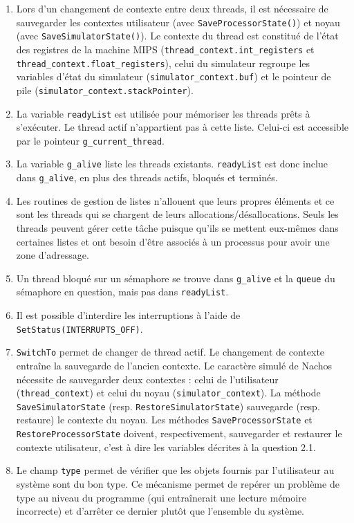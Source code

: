 \documentclass[a4paper,11pt,french]{article}
\begin{document}
\begin{enumerate}
\item Lors d'un changement de contexte entre deux threads, il est nécessaire de sauvegarder les contextes utilisateur (avec \texttt{SaveProcessorState()}) et noyau (avec \texttt{SaveSimulatorState()}). Le contexte du thread est constitué de l'état des registres de la machine MIPS (\texttt{thread\_context.int\_registers} et \texttt{thread\_context.float\_registers}), celui du simulateur regroupe les variables d'état du simulateur (\texttt{simulator\_context.buf}) et le pointeur de pile (\texttt{simulator\_context.stackPointer}).
\item La variable \texttt{readyList} est utilisée pour mémoriser les threads prêts à s'exécuter. Le thread actif n'appartient pas à cette liste. Celui-ci est accessible par le pointeur \texttt{g\_current\_thread}.
\item La variable \texttt{g\_alive} liste les threads existants. \texttt{readyList} est donc inclue dans \texttt{g\_alive}, en plus des threads actifs, bloqués et terminés.
\item Les routines de gestion de listes n'allouent que leurs propres éléments et ce sont les threads qui se chargent de leurs allocations/désallocations. Seuls les threads peuvent gérer cette tâche puisque qu'ils se mettent eux-mêmes dans certaines listes et ont besoin d'être associés à un processus pour avoir une zone d'adressage.
\item Un thread bloqué sur un sémaphore se trouve dans \texttt{g\_alive} et la \texttt{queue} du sémaphore en question, mais pas dans \texttt{readyList}.
\item Il est possible d'interdire les interruptions à l'aide de \texttt{SetStatus(INTERRUPTS\_OFF)}.
\item \texttt{SwitchTo} permet de changer de thread actif. Le changement de contexte entraîne la sauvegarde de l'ancien contexte. Le caractère simulé de Nachos nécessite de sauvegarder deux contextes : celui de l'utilisateur (\texttt{thread\_context}) et celui du noyau (\texttt{simulator\_context}). La méthode \texttt{SaveSimulatorState} (resp. \texttt{RestoreSimulatorState}) sauvegarde (resp. restaure) le contexte du noyau. Les méthodes \texttt{SaveProcessorState} et \texttt{RestoreProcessorState} doivent, respectivement, sauvegarder et restaurer le contexte utilisateur, c'est à dire les variables décrites à la question 2.1.
\item Le champ \texttt{type} permet de vérifier que les objets fournis par l'utilisateur au système sont du bon type. Ce mécanisme permet de repérer un problème de type au niveau du programme (qui entraînerait une lecture mémoire incorrecte) et d'arrêter ce dernier plutôt que l'ensemble du système.
\end{enumerate}
\end{document}
